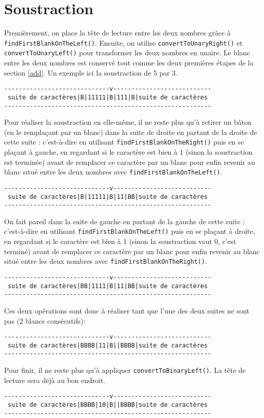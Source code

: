 \documentclass[a4paper,11pt]{article}
\begin{document}
\section{Soustraction}
Premièrement, on place la tête de lecture entre les deux nombres grâce à \texttt{findFirstBlankOnTheLeft()}.
Ensuite, on utilise \texttt{convertToUnaryRight()} et \texttt{convertToUnaryLeft()} pour transformer les deux nombres en unaire. Le blanc entre les deux nombres est conservé tout comme les deux premières étapes de la section \ref{add}. Un exemple ici la soustraction de 5 par 3.
\begin{verbatim}
-----------------------------v---------------------------
 suite de caractères|B|11111|B|111|B|suite de caractères
---------------------------------------------------------
\end{verbatim}
Pour réaliser la soustraction en elle-même, il ne reste plus qu'à retirer un bâton (en le remplaçant par un blanc) dans la suite de droite en partant de la droite de cette suite : c'est-à-dire en utilisant \texttt{findFirstBlankOnTheRight()} puis en se plaçant à gauche, en regardant si le caractère est bien à 1 (sinon la soustraction est terminée) avant de remplacer ce caractère par un blanc pour enfin revenir au blanc situé entre les deux nombres avec \texttt{findFirstBlankOnTheLeft()}.\\
\begin{verbatim}
-----------------------------v---------------------------
 suite de caractères|B|11111|B|11|BB|suite de caractères
---------------------------------------------------------
\end{verbatim}
On fait pareil dans la suite de gauche en partant de la gauche de cette suite : c'est-à-dire en utilisant \texttt{findFirstBlankOnTheLeft()} puis en se plaçant à droite, en regardant si le caractère  est bien à 1 (sinon la soustraction vaut 0, c'est terminé) avant de remplacer ce caractère par un blanc pour enfin revenir au blanc situé entre les deux nombres avec \texttt{findFirstBlankOnTheRight()}.\\
\begin{verbatim}
-----------------------------v---------------------------
 suite de caractères|BB|1111|B|11|BB|suite de caractères
---------------------------------------------------------
\end{verbatim}
Ces deux opérations sont donc à réaliser tant que l'une des deux suites ne sont pas (2 blancs consécutifs):
\begin{verbatim}
-----------------------------v---------------------------
 suite de caractères|BBBB|11|B||BBBB|suite de caractères
---------------------------------------------------------
\end{verbatim}
Pour finir, il ne reste plus qu'à appliquer \texttt{convertToBinaryLeft()}. La tête de lecture sera déjà au bon endroit.
\begin{verbatim}
-----------------------------v---------------------------
 suite de caractères|BBBB|10|B||BBBB|suite de caractères
---------------------------------------------------------
\end{verbatim}
\end{document}
